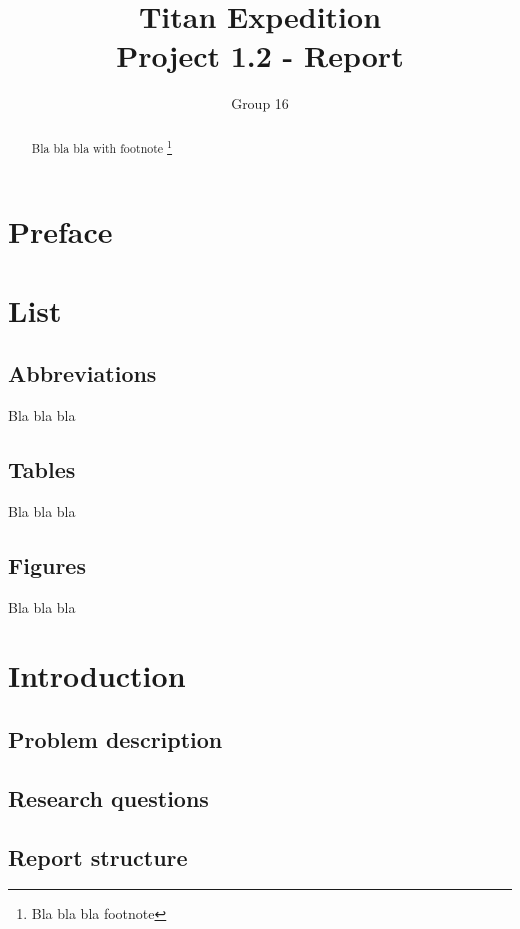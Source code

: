 \documentclass[10pt,a4paper]{article}
\author{Group 16}
\title{Titan Expedition\\ Project 1.2 - Report}
\begin{document}
	\maketitle
	\newpage
	
	\section*{Preface}
	
	\begin{abstract}
	Bla bla bla with footnote \footnote{Bla bla bla footnote}	
	\end{abstract}

	\newpage
	
	\tableofcontents
	\newpage

	\section{List}
	\subsection{Abbreviations}
	Bla bla bla
	\subsection{Tables}
	Bla bla bla
	\subsection{Figures}
	Bla bla bla
	
	\section{Introduction}

	\subsection{Problem description}

	\subsection{Research questions}

	\subsection{Report structure}

\end{document}
